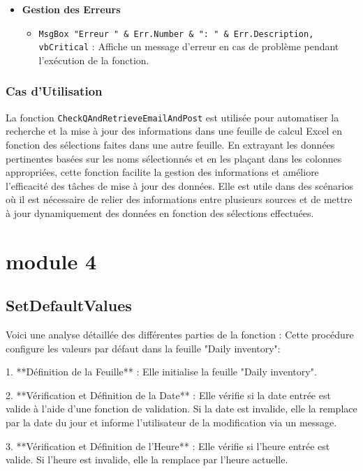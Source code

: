 \documentclass[a4paper, oneside, 12pt, final]{extreport}
\begin{document}
\begin{itemize}
    \item \textbf{Gestion des Erreurs} 
    \begin{itemize}
        \item \texttt{MsgBox "Erreur " \& Err.Number \& ": " \& Err.Description, vbCritical} : Affiche un message d'erreur en cas de problème pendant l'exécution de la fonction.
    \end{itemize}
\end{itemize}

\subsubsection{Cas d'Utilisation}

La fonction \texttt{CheckQAndRetrieveEmailAndPost} est utilisée pour automatiser la recherche et la mise à jour des informations dans une feuille de calcul Excel en fonction des sélections faites dans une autre feuille. En extrayant les données pertinentes basées sur les noms sélectionnés et en les plaçant dans les colonnes appropriées, cette fonction facilite la gestion des informations et améliore l'efficacité des tâches de mise à jour des données. Elle est utile dans des scénarios où il est nécessaire de relier des informations entre plusieurs sources et de mettre à jour dynamiquement des données en fonction des sélections effectuées.
\section{module 4}
\subsection{SetDefaultValues}

Voici une analyse détaillée des différentes parties de la fonction :
Cette procédure configure les valeurs par défaut dans la feuille "Daily inventory":

1. **Définition de la Feuille** : Elle initialise la feuille "Daily inventory".

2. **Vérification et Définition de la Date** : Elle vérifie si la date entrée est valide à l'aide d'une fonction de validation. Si la date est invalide, elle la remplace par la date du jour et informe l'utilisateur de la modification via un message.

3. **Vérification et Définition de l'Heure** : Elle vérifie si l'heure entrée est valide. Si l'heure est invalide, elle la remplace par l'heure actuelle.
\end{document}
